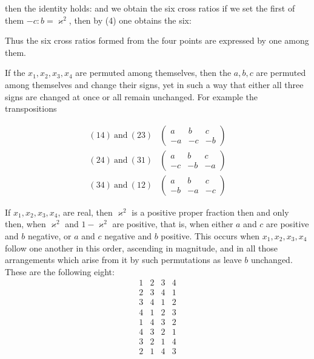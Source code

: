 then the identity holds:
and we obtain the six cross ratios
if we set the first of them $-c:b=\varkappa^2$, then by (4) one obtains the six:

Thus the six cross ratios formed from the four points are expressed  by one among them.

If the $x_1, x_2, x_3, x_4$ are permuted among themselves, then the $a, b, c$ are permuted among themselves and change their signs, yet in such a way that either all three signs are changed at once or all remain unchanged. For example the transpositions

\[
\begin{aligned}
(14)\ \text{and}\ (23) & \begin{pmatrix} a & b & c \\ -a & -c & -b \end{pmatrix} \\
(24)\ \text{and}\ (31) & \begin{pmatrix} a & b & c \\ -c & -b & -a \end{pmatrix} \\
(34)\ \text{and}\ (12) & \begin{pmatrix} a & b & c \\ -b & -a & -c \end{pmatrix}
\end{aligned}
\]


If $x_1, x_2, x_3, x_4$, are real, then $\varkappa^2$ is a positive proper fraction then and only then, when $\varkappa^2$ and $1-\varkappa^2$ are positive, that is, when either $a$ and $c$ are positive and $b$ negative, or $a$ and $c$ negative and $b$ positive. This occurs when $x_1, x_2, x_3, x_4$ follow one another in this order, ascending in magnitude, and in all those arrangements which arise from it by such permutations as leave $b$ unchanged. These are the following eight:
\[
\begin{array}{cccc}
1 & 2 & 3 & 4 \\
2 & 3 & 4 & 1 \\
3 & 4 & 1 & 2 \\
4 & 1 & 2 & 3 \\
1 & 4 & 3 & 2 \\
4 & 3 & 2 & 1 \\
3 & 2 & 1 & 4 \\
2 & 1 & 4 & 3
\end{array}
\]
